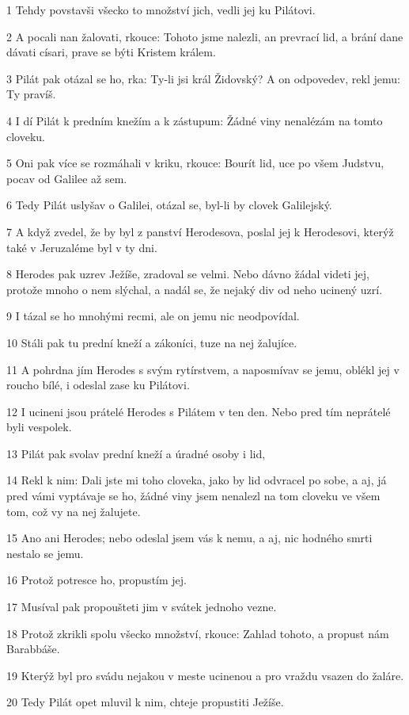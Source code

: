 \par 1 Tehdy povstavši všecko to množství jich, vedli jej ku Pilátovi.
\par 2 A pocali nan žalovati, rkouce: Tohoto jsme nalezli, an prevrací lid, a brání dane dávati císari, prave se býti Kristem králem.
\par 3 Pilát pak otázal se ho, rka: Ty-li jsi král Židovský? A on odpovedev, rekl jemu: Ty pravíš.
\par 4 I dí Pilát k predním knežím a k zástupum: Žádné viny nenalézám na tomto cloveku.
\par 5 Oni pak více se rozmáhali v kriku, rkouce: Bourít lid, uce po všem Judstvu, pocav od Galilee až sem.
\par 6 Tedy Pilát uslyšav o Galilei, otázal se, byl-li by clovek Galilejský.
\par 7 A když zvedel, že by byl z panství Herodesova, poslal jej k Herodesovi, kterýž také v Jeruzaléme byl v ty dni.
\par 8 Herodes pak uzrev Ježíše, zradoval se velmi. Nebo dávno žádal videti jej, protože mnoho o nem slýchal, a nadál se, že nejaký div od neho ucinený uzrí.
\par 9 I tázal se ho mnohými recmi, ale on jemu nic neodpovídal.
\par 10 Stáli pak tu prední kneží a zákoníci, tuze na nej žalujíce.
\par 11 A pohrdna jím Herodes s svým rytírstvem, a naposmívav se jemu, oblékl jej v roucho bílé, i odeslal zase ku Pilátovi.
\par 12 I ucineni jsou prátelé Herodes s Pilátem v ten den. Nebo pred tím neprátelé byli vespolek.
\par 13 Pilát pak svolav prední kneží a úradné osoby i lid,
\par 14 Rekl k nim: Dali jste mi toho cloveka, jako by lid odvracel po sobe, a aj, já pred vámi vyptávaje se ho, žádné viny jsem nenalezl na tom cloveku ve všem tom, což vy na nej žalujete.
\par 15 Ano ani Herodes; nebo odeslal jsem vás k nemu, a aj, nic hodného smrti nestalo se jemu.
\par 16 Protož potresce ho, propustím jej.
\par 17 Musíval pak propoušteti jim v svátek jednoho vezne.
\par 18 Protož zkrikli spolu všecko množství, rkouce: Zahlad tohoto, a propust nám Barabbáše.
\par 19 Kterýž byl pro svádu nejakou v meste ucinenou a pro vraždu vsazen do žaláre.
\par 20 Tedy Pilát opet mluvil k nim, chteje propustiti Ježíše.
